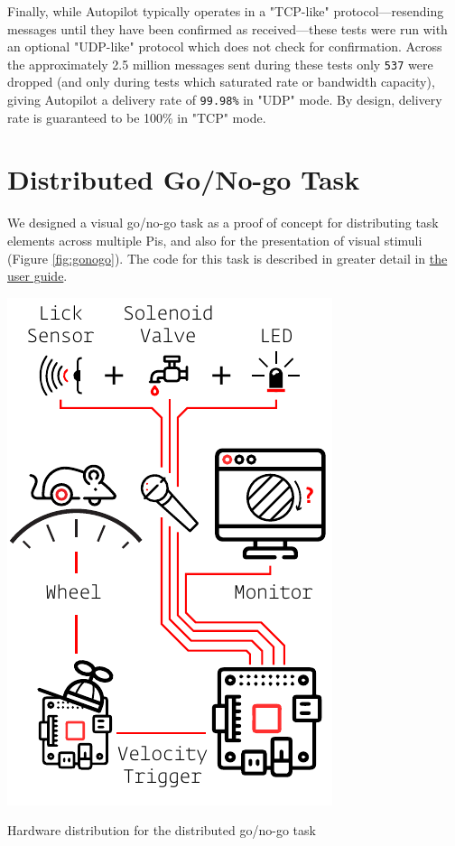 Finally, while Autopilot typically operates in a "TCP-like" protocol---resending messages until they have been confirmed as received---these tests were run with an optional "UDP-like" protocol which does not check for confirmation. Across the approximately 2.5 million messages sent during these tests only \texttt{537} were dropped (and only during tests which saturated rate or bandwidth capacity), giving Autopilot a delivery rate of \texttt{99.98\%} in "UDP" mode. By design, delivery rate is guaranteed to be 100\% in "TCP" mode.

\section{Distributed Go/No-go Task}
\label{sec:gonogo}

We designed a visual go/no-go task as a proof of concept for distributing task elements across multiple Pis, and also for the presentation of visual stimuli (Figure \ref{fig:gonogo}). The code for this task is described in greater detail in \href{http://docs.auto-pi-lot.com/guide.task.html#distributed-go-no-go-using-child-agents}{the user guide}.

\begin{marginfigure}[-1.3cm]
\includegraphics[]{figures/test_5_gonogo.pdf}
\caption{Hardware distribution for the distributed go/no-go task}
\label{fig:gonogo}
\end{marginfigure}

